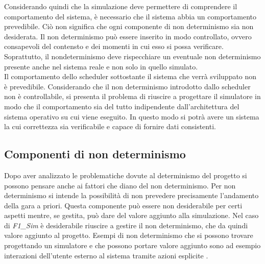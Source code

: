 Considerando quindi che la simulazione deve permettere di comprendere il
comportamento del sistema, è necessario che il sistema abbia 
un comportamento prevedibile. Ciò non significa che ogni componente di non
determinismo sia non desiderata. Il non determinismo
può essere inserito in modo controllato, ovvero consapevoli del contensto e dei
momenti in cui esso si possa verificare. Soprattutto,
il nondeterminismo deve rispecchiare un eventuale non determinismo presente
anche nel sistema reale e non solo in quello simulato.\\
Il comportamento dello scheduler sottostante il sistema che verrà sviluppato non
è prevedibile. Considerando che il non determinismo
introdotto dallo scheduler non è controllabile, si presenta
il problema di riuscire a progettare il simulatore in modo
che il comportamento sia del tutto indipendente dall'architettura del sistema
operativo su cui viene eseguito. In questo
modo si potrà avere un sistema la cui correttezza sia verificabile e capace di
fornire dati consistenti.
\subsection{Componenti di non determinismo }
\label{non_determinismo}
Dopo aver analizzato le problematiche dovute al determinismo del progetto si
possono pensare anche ai fattori che diano del non determinismo.
Per non determinismo si intende la possibilit\`{a} di non prevedere precisamente
l'andamento della gara a priori. Questa componente pu\`{o} essere non
desiderabile per certi aspetti mentre, se gestita, pu\`{o} dare del valore
aggiunto alla simulazione. Nel caso di \emph{F1\_Sim} \`{e} desiderabile
riuscire a gestire il non determinismo, che da quindi valore aggiunto al
progetto.
Esempi di non determinismo che si possono trovare progettando un simulatore e
che possono portare valore aggiunto sono ad esempio interazioni dell'utente
esterno al sistema tramite azioni esplicite .
